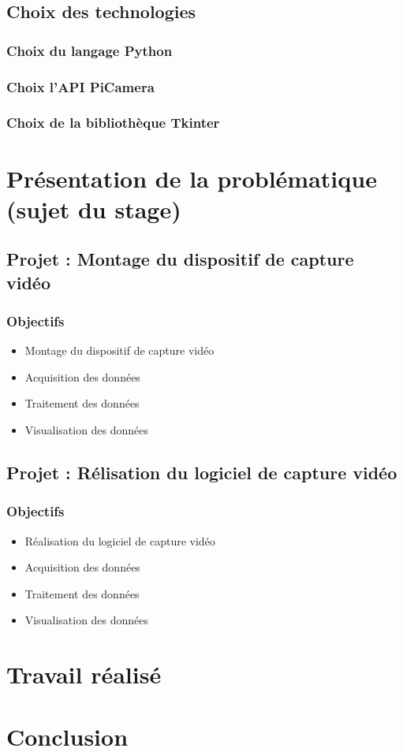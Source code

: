 \documentclass[a4paper, 11pt]{report}
\begin{document}
    \section{Choix des technologies}
        \subsection{Choix du langage Python}
        \subsection{Choix l'API PiCamera}
        \subsection{Choix de la bibliothèque Tkinter}

\chapter{Présentation de la problématique (sujet du stage)}
\minitoc
    \section{Projet : Montage du dispositif de capture vidéo}
      
        \subsection{Objectifs}
            \begin{itemize}
                \item Montage du dispositif de capture vidéo
                \item Acquisition des données
                \item Traitement des données
                \item Visualisation des données
            \end{itemize}
    

    \section{Projet : Rélisation du logiciel de capture vidéo}
        \subsection{Objectifs}
            \begin{itemize}
                \item Réalisation du logiciel de capture vidéo
                \item Acquisition des données
                \item Traitement des données
                \item Visualisation des données
            \end{itemize}

\chapter{Travail réalisé}
\minitoc      

\chapter{Conclusion}
\minitoc      
\end{document}
